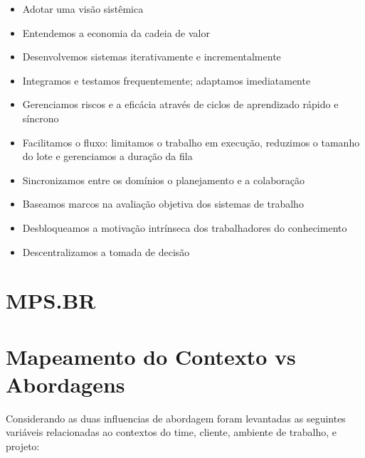 \begin{itemize}
  \item Adotar uma visão sistêmica
  \item Entendemos a economia da cadeia de valor
  \item Desenvolvemos sistemas iterativamente e incrementalmente
  \item Integramos e testamos frequentemente; adaptamos imediatamente
  \item Gerenciamos riscos e a eficácia através de ciclos de aprendizado rápido e síncrono
  \item Facilitamos o fluxo: limitamos o trabalho em execução, reduzimos o tamanho
  do lote e gerenciamos a duração da fila
  \item Sincronizamos entre os domínios o planejamento e a colaboração
  \item Baseamos marcos na avaliação objetiva dos sistemas de trabalho
  \item Desbloqueamos a motivação intrínseca dos trabalhadores do conhecimento
  \item Descentralizamos a tomada de decisão
\end{itemize}

\section{MPS.BR}

\section{Mapeamento do Contexto vs Abordagens}

Considerando as duas influencias de abordagem foram levantadas as seguintes variáveis
relacionadas ao contextos do time, cliente, ambiente de trabalho, e projeto:

